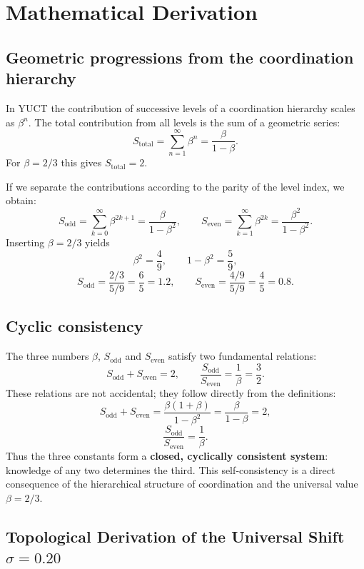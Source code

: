 \documentclass[12pt,a4paper]{article}
\begin{document}
	\section{Mathematical Derivation}
	
	\subsection{Geometric progressions from the coordination hierarchy}
	In YUCT the contribution of successive levels of a coordination hierarchy scales as \(\beta^n\). The total contribution from all levels is the sum of a geometric series:
	\[
	S_{\text{total}} = \sum_{n=1}^{\infty} \beta^n = \frac{\beta}{1-\beta}.
	\]
	For \(\beta = 2/3\) this gives \(S_{\text{total}} = 2\).
	
	If we separate the contributions according to the parity of the level index, we obtain:
	\[
	S_{\text{odd}} = \sum_{k=0}^{\infty} \beta^{2k+1} = \frac{\beta}{1-\beta^2},
	\qquad
	S_{\text{even}} = \sum_{k=1}^{\infty} \beta^{2k} = \frac{\beta^2}{1-\beta^2}.
	\]
	Inserting \(\beta = 2/3\) yields
	\[
	\beta^2 = \frac{4}{9},\qquad 1-\beta^2 = \frac{5}{9},
	\]
	\[
	S_{\text{odd}} = \frac{2/3}{5/9} = \frac{6}{5}=1.2,\qquad
	S_{\text{even}} = \frac{4/9}{5/9} = \frac{4}{5}=0.8.
	\]
	
	\subsection{Cyclic consistency}
	The three numbers \(\beta\), \(S_{\text{odd}}\) and \(S_{\text{even}}\) satisfy two fundamental relations:
	\[
	S_{\text{odd}} + S_{\text{even}} = 2,\qquad
	\frac{S_{\text{odd}}}{S_{\text{even}}} = \frac{1}{\beta} = \frac{3}{2}.
	\]
	These relations are not accidental; they follow directly from the definitions:
	\[
	S_{\text{odd}} + S_{\text{even}} = \frac{\beta(1+\beta)}{1-\beta^2} = \frac{\beta}{1-\beta}=2,
	\]
	\[
	\frac{S_{\text{odd}}}{S_{\text{even}}} = \frac{1}{\beta}.
	\]
	Thus the three constants form a \textbf{closed, cyclically consistent system}: knowledge of any two determines the third. This self‑consistency is a direct consequence of the hierarchical structure of coordination and the universal value \(\beta=2/3\).
	
	\subsection{Topological Derivation of the Universal Shift \(\sigma = 0.20\)}
	\label{sec:sigma_topology}
	
\end{document}
